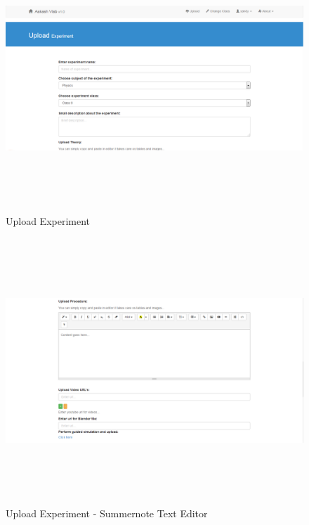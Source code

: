 \documentclass[12pt]{report}
\begin{document}
\begin{figure}[H]
 \centering 
 \includegraphics[width=15cm, height=10cm]{./321.jpg}
 \caption{Upload Experiment \label{fig:321}}
\end{figure}
\begin{figure}[H]
 \centering 
 \includegraphics[width=15cm, height=10cm]{./322.jpg}
 \caption{Upload Experiment - Summernote Text Editor \label{fig:322}}
\end{figure}
\end{document}

